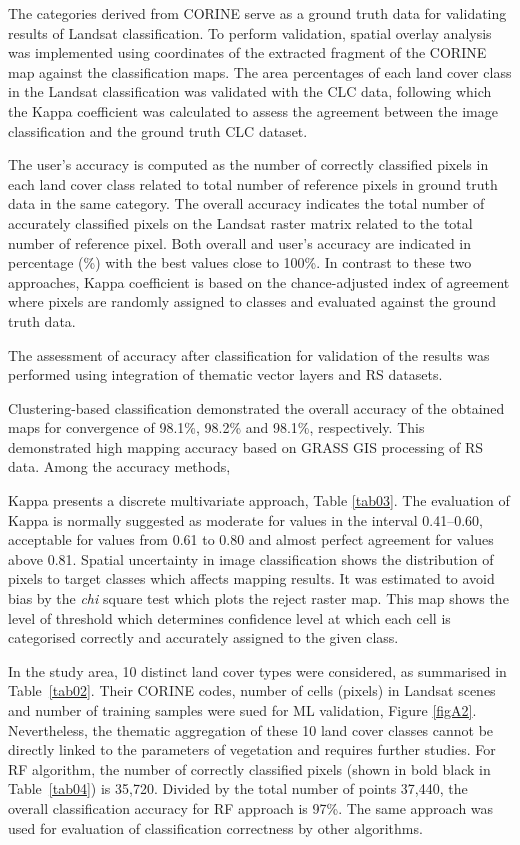 \documentclass[jimaging,article,accept,pdftex,oneauthor]{Definitions/mdpi}
\begin{document}
 {The categories derived from CORINE serve as a ground truth data for validating results of Landsat classification. To perform validation, spatial overlay analysis was implemented using coordinates of the extracted fragment of the CORINE map against the classification maps. The area percentages of each land cover class in the Landsat classification was validated with the CLC data, following which  the Kappa coefficient was calculated to assess the agreement between the image classification and the ground truth CLC dataset.}

The user's accuracy is computed as the number of correctly classified pixels in each land cover class related to total number of reference pixels in {ground truth} data in the same category. The overall accuracy indicates the total number of accurately classified pixels on the Landsat raster matrix related to the total number of reference pixel. Both overall and user's accuracy are indicated in percentage (\%) with the best values close to 100\%. In contrast to these two approaches, Kappa coefficient is based on the chance-adjusted index of agreement where pixels are randomly assigned to classes and evaluated against the ground truth data. {The assessment of accuracy after classification for validation of the results was performed using integration of thematic vector layers and RS datasets. 

Clustering-based classification demonstrated the overall accuracy of the obtained maps for convergence of 98.1\%, 98.2\% and 98.1\%, respectively. This demonstrated high mapping accuracy based on GRASS GIS processing of {RS} data. Among the accuracy methods, }Kappa presents a discrete multivariate {approach}, {Table }\ref{tab03}. The evaluation of Kappa is normally suggested as moderate for values in the interval 0.41--0.60, acceptable for values from 0.61 to 0.80 and almost perfect agreement for values above 0.81. Spatial uncertainty in image classification shows the distribution of pixels to target classes which affects mapping {results}. It was estimated to avoid bias by the \emph{chi} square test which plots the reject raster map. This map shows the level of threshold which determines{ }confidence level at which each cell is categorised correctly and accurately assigned to the {given} class. 

In the study area, 10 distinct land cover types {were considered, as} summarised in Table~\ref{tab02}. {Their} CORINE codes, number of cells (pixels) in Landsat scenes and{ }number of training samples {were sued }for ML validation, Figure \ref{figA2}. Nevertheless, the thematic aggregation of these 10 land cover classes cannot be directly linked to the parameters of vegetation and requires further studies{. For} RF algorithm, the number of correctly classified pixels (shown in bold black %
 in Table~\ref{tab04}) is 35,720. Divided by the total number of points 37,440, the overall classification accuracy for RF approach is {97}\%. The same approach was used for evaluation of classification correctness by other algorithms. 
\end{document}
